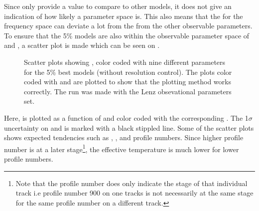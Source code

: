 Since \chis only provide a value to compare to other models, it does not give an indication of how likely a
parameter space is. This also means that the \chis for the frequency space can deviate a lot from the \chis from the other observable parameters. To ensure that the 5\% models are also within the observable parameter space of \logg and \teff, a scatter plot is made which can be seen on . 

\begin{figure}[htbp]
	\centering
	\caption{Scatter plots showing \teff, \logg color coded with nine different parameters for the 5\% best models (without resolution control). The plots color coded with \teff and \logg are plotted to show that the plotting method works correctly. The run was made with the Lenz obsevational parameters set. }
	\label{scatter}
\end{figure}


Here, \logg is plotted as a function of \teff and color coded with the corresponding \chis. The 1$\sigma$ uncertainty on \logg and \teff is marked with a black stippled line. Some of the scatter plots shows expected tendencies such as \lum, \logg, \teff and profile numbers. Since higher profile number is at a later stage\footnote{Note that the profile number does only indicate the stage of that individual track i.e profile number 900 on one tracks is not necessarily at the same stage for the same profile number on a different track. }, the effective temperature is much lower for lower profile numbers.%

